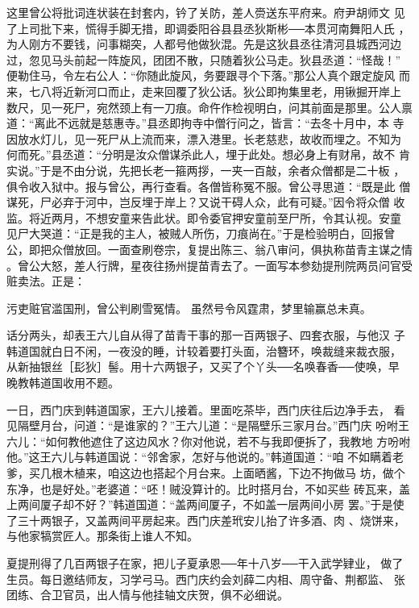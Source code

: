 这里曾公将批词连状装在封套内，钤了关防，差人赍送东平府来。府尹胡师文
见了上司批下来，慌得手脚无措，即调委阳谷县县丞狄斯彬──本贯河南舞阳人氏
，为人刚方不要钱，问事糊突，人都号他做狄混。先是这狄县丞往清河县城西河边
过，忽见马头前起一阵旋风，团团不散，只随着狄公马走。狄县丞道：“怪哉！”
便勒住马，令左右公人：“你随此旋风，务要跟寻个下落。”那公人真个跟定旋风
而来，七八将近新河口而止，走来回覆了狄公话。狄公即拘集里老，用锹掘开岸上
数尺，见一死尸，宛然颈上有一刀痕。命仵作检视明白，问其前面是那里。公人禀
道：“离此不远就是慈惠寺。”县丞即拘寺中僧行问之，皆言：“去冬十月中，本
寺因放水灯儿，见一死尸从上流而来，漂入港里。长老慈悲，故收而埋之。不知为
何而死。”县丞道：“分明是汝众僧谋杀此人，埋于此处。想必身上有财帛，故不
肯实说。”于是不由分说，先把长老一箍两拶，一夹一百敲，余者众僧都是二十板
，俱令收入狱中。报与曾公，再行查看。各僧皆称冤不服。曾公寻思道：“既是此
僧谋死，尸必弃于河中，岂反埋于岸上？又说干碍人众，此有可疑。”因令将众僧
收监。将近两月，不想安童来告此状。即令委官押安童前至尸所，令其认视。安童
见尸大哭道：“正是我的主人，被贼人所伤，刀痕尚在。”于是检验明白，回报曾
公，即把众僧放回。一面查刷卷宗，复提出陈三、翁八审问，俱执称苗青主谋之情
。曾公大怒，差人行牌，星夜往扬州提苗青去了。一面写本参劾提刑院两员问官受
赃卖法。正是：

污吏赃官滥国刑，曾公判刷雪冤情。
虽然号令风霆肃，梦里输赢总未真。

话分两头，却表王六儿自从得了苗青干事的那一百两银子、四套衣服，与他汉
子韩道国就白日不闲，一夜没的睡，计较着要打头面，治簪环，唤裁缝来裁衣服，
从新抽银丝［髟狄］髻。用十六两银子，又买了个丫头──名唤春香──使唤，早
晚教韩道国收用不题。

一日，西门庆到韩道国家，王六儿接着。里面吃茶毕，西门庆往后边净手去，
看见隔壁月台，问道：“是谁家的？”王六儿道：“是隔壁乐三家月台。”西门庆
吩咐王六儿：“如何教他遮住了这边风水？你对他说，若不与我即便拆了，我教地
方吩咐他。”这王六儿与韩道国说：“邻舍家，怎好与他说的。”韩道国道：“咱
不如瞒着老爹，买几根木植来，咱这边也搭起个月台来。上面晒酱，下边不拘做马
坊，做个东净，也是好处。”老婆道：“呸！贼没算计的。比时搭月台，不如买些
砖瓦来，盖上两间厦子却不好？”韩道国道：“盖两间厦子，不如盖一层两间小房
罢。”于是使了三十两银子，又盖两间平房起来。西门庆差玳安儿抬了许多酒、肉
、烧饼来，与他家犒赏匠人。那条街上谁人不知。

夏提刑得了几百两银子在家，把儿子夏承恩──年十八岁──干入武学肄业，
做了生员。每日邀结师友，习学弓马。西门庆约会刘薛二内相、周守备、荆都监、
张团练、合卫官员，出人情与他挂轴文庆贺，俱不必细说。

